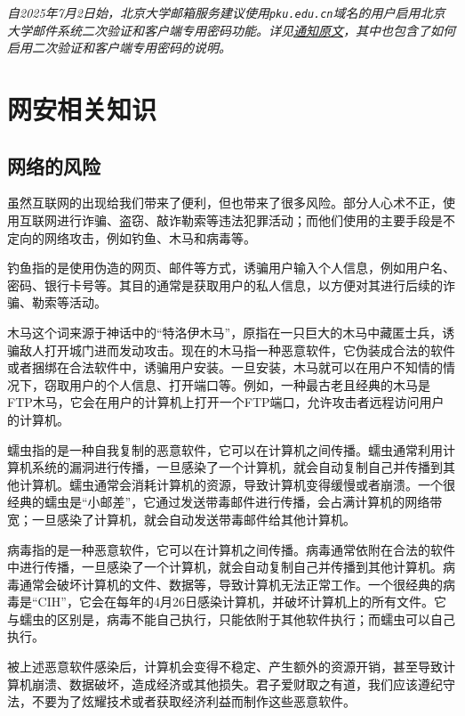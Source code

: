 \documentclass[../main.tex]{subfiles}
\begin{document}
\emph{自2025年7月2日始，北京大学邮箱服务建议使用\texttt{pku.edu.cn}域名的用户启用北京大学邮件系统二次验证和客户端专用密码功能。详见\href{https://its.pku.edu.cn/announce/tz20250702100126.jsp}{通知原文}，其中也包含了如何启用二次验证和客户端专用密码的说明。}


\section{网安相关知识} %

\subsection{网络的风险}

虽然互联网的出现给我们带来了便利，但也带来了很多风险。部分人心术不正，使用互联网进行诈骗、盗窃、敲诈勒索等违法犯罪活动；而他们使用的主要手段是不定向的网络攻击，例如钓鱼、木马和病毒等。

钓鱼指的是使用伪造的网页、邮件等方式，诱骗用户输入个人信息，例如用户名、密码、银行卡号等。其目的通常是获取用户的私人信息，以方便对其进行后续的诈骗、勒索等活动。

木马这个词来源于神话中的“特洛伊木马”，原指在一只巨大的木马中藏匿士兵，诱骗敌人打开城门进而发动攻击。现在的木马指一种恶意软件，它伪装成合法的软件或者捆绑在合法软件中，诱骗用户安装。一旦安装，木马就可以在用户不知情的情况下，窃取用户的个人信息、打开端口等。例如，一种最古老且经典的木马是FTP木马，它会在用户的计算机上打开一个FTP端口，允许攻击者远程访问用户的计算机。

蠕虫指的是一种自我复制的恶意软件，它可以在计算机之间传播。蠕虫通常利用计算机系统的漏洞进行传播，一旦感染了一个计算机，就会自动复制自己并传播到其他计算机。蠕虫通常会消耗计算机的资源，导致计算机变得缓慢或者崩溃。一个很经典的蠕虫是“小邮差”，它通过发送带毒邮件进行传播，会占满计算机的网络带宽；一旦感染了计算机，就会自动发送带毒邮件给其他计算机。

病毒指的是一种恶意软件，它可以在计算机之间传播。病毒通常依附在合法的软件中进行传播，一旦感染了一个计算机，就会自动复制自己并传播到其他计算机。病毒通常会破坏计算机的文件、数据等，导致计算机无法正常工作。一个很经典的病毒是“CIH”，它会在每年的4月26日感染计算机，并破坏计算机上的所有文件。它与蠕虫的区别是，病毒不能自己执行，只能依附于其他软件执行；而蠕虫可以自己执行。

被上述恶意软件感染后，计算机会变得不稳定、产生额外的资源开销，甚至导致计算机崩溃、数据破坏，造成经济或其他损失。君子爱财取之有道，我们应该遵纪守法，不要为了炫耀技术或者获取经济利益而制作这些恶意软件。
\end{document}
